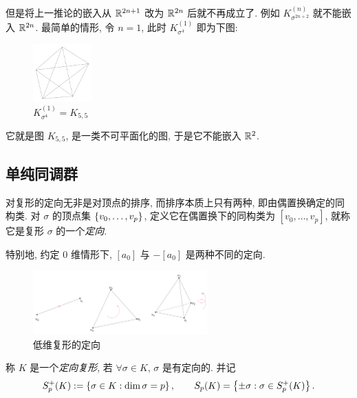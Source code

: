     但是将上一推论的嵌入从 $ \mathbb{R}^{2n+1} $ 改为 $ \mathbb{R}^{2n} $ 后就不再成立了. 例如 $ K_{\sigma^{2n+2}}^{(n)} $ 就不能嵌入 $ \mathbb{R}^{2n} $. 最简单的情形, 令 $ n=1 $, 此时 $ K_{\sigma^4}^{(1)} $ 即为下图:
    \begin{figure}[htbp]
        \centering
        \includegraphics[width=0.2\textwidth]{figures/Sec2-1.png}
        \caption{$ K_{\sigma^4}^{(1)}=K_{5,5} $}
    \end{figure}
    它就是图 $ K_{5,5} $, 是一类不可平面化的图, 于是它不能嵌入 $ \mathbb{R}^2 $.

	\subsection{单纯同调群}

	对复形的定向无非是对顶点的排序, 而排序本质上只有两种, 即由偶置换确定的同构类. 对 $ \sigma $ 的顶点集 $ \left\{ v_0,\dots, v_p \right\} $, 定义它在偶置换下的同构类为 $ [v_0,\dots,v_p] $, 就称它是复形 $ \sigma $ 的一个\emph{定向}.

    特别地, 约定 0 维情形下, $ [a_0] $ 与 $ -[a_0] $ 是两种不同的定向.

    \begin{figure}[htbp]
        \centering
        \includegraphics[width=0.6\textwidth]{figures/Sec3-1.png}
        \caption{低维复形的定向}
    \end{figure}

    \begin{Definition}[定向复形]
        称 $ K $ 是一个\emph{定向复形}, 若 $ \forall \sigma\in K $, $ \sigma $ 是有定向的. 并记
        \[
            S_p^+(K):=\left\{ \sigma\in K : \dim\sigma=p \right\},\qquad S_p(K)=\left\{ \pm\sigma : \sigma\in S_p^+(K) \right\}.
        \]
    \end{Definition}


